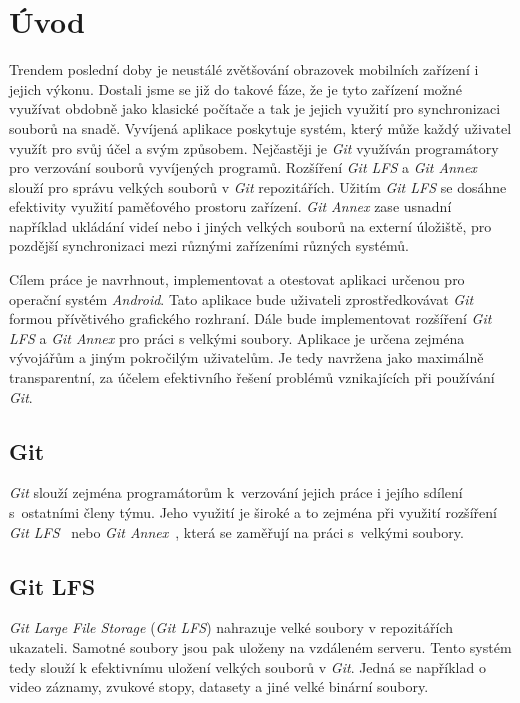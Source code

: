 \chapter{Úvod}
Trendem poslední doby je neustálé zvětšování obrazovek mobilních zařízení i jejich výkonu. Dostali jsme se již do takové fáze, že je tyto zařízení možné využívat obdobně jako klasické počítače a tak je jejich využití pro synchronizaci souborů na snadě.
Vyvíjená aplikace poskytuje systém, který může každý uživatel využít pro svůj účel a svým způsobem. Nejčastěji je \emph{Git} využíván programátory pro verzování souborů vyvíjených programů. Rozšíření \emph{Git LFS} a \emph{Git Annex} slouží pro správu velkých souborů v \emph{Git} repozitářích. Užitím \emph{Git LFS} se dosáhne efektivity využití paměťového prostoru zařízení. \emph{Git Annex} zase usnadní například ukládání videí nebo i jiných velkých souborů na externí úložiště, pro pozdější synchronizaci mezi různými zařízeními různých systémů.

Cílem práce je navrhnout, implementovat a otestovat aplikaci určenou pro operační systém \emph{Android}. Tato aplikace bude uživateli zprostředkovávat \emph{Git} formou přívětivého grafického rozhraní. Dále bude implementovat rozšíření \emph{Git LFS} a \emph{Git Annex} pro práci s velkými soubory. Aplikace je určena zejména vývojářům a jiným pokročilým uživatelům. Je tedy navržena jako maximálně transparentní, za účelem efektivního řešení problémů vznikajících při používání \emph{Git}.
\newpage
\section{Git}
\emph{Git} slouží zejména programátorům k verzování jejich práce i jejího sdílení s ostatními členy týmu. Jeho využití je široké a to zejména při využití rozšíření \emph{Git LFS}~\cite{git-lfs} nebo \emph{Git Annex}~\cite{git-annex}, která se zaměřují na práci s velkými soubory.

\section{Git LFS}
\emph{Git Large File Storage} (\emph{Git LFS}) nahrazuje velké soubory v repozitářích ukazateli. Samotné soubory jsou pak uloženy na vzdáleném serveru. Tento systém tedy slouží k efektivnímu uložení velkých souborů v \emph{Git}. Jedná se například o video záznamy, zvukové stopy, datasety a jiné velké binární soubory.

